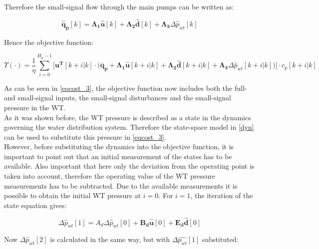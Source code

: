 Therefore the small-signal flow through the main pumps can be written as: 

 \begin{equation}
 \bm{\hat{q}_{p}}[k] =   \bm{\Lambda_1} \bm{\hat{u}}[k] + \bm{\Lambda_2} \bm{\hat{d}}[k] + \bm{\Lambda_3} \Delta \hat{p}_{wt}[k]
 \label{pumpflows_simplified}
\end{equation}

Hence the objective function:

\begin{equation}
 \Upsilon(\cdot) = \frac{1}{\eta} \sum_{i=0}^{H_p-1} \Big[ \bm{u^T}[k+i|k] \cdot \Big(\bm{\bar{q}_p} +  \bm{\Lambda_1} \bm{\hat{u}}[k+i|k] + \bm{\Lambda_2} \bm{\hat{d}}[k+i|k] + \bm{\Lambda_3} \Delta \hat{p}_{wt}[k+i|k]\Big)\Big]  \cdot c_p[k+i|k]
\label{eqcost_3} 
\end{equation}

As can be seen in \eqref{eqcost_3}, the objective function now includes both the full- and small-signal inputs, the small-signal disturbances and the small-signal pressure in the WT.
\\
As it was shown before, the WT pressure is described as a state in the dynamics governing the water distribution system. Therefore the state-space model in \eqref{dyn} can be used to substitute this pressure in \eqref{eqcost_3}. 
\\
However, before substituting the dynamics into the objective function, it is important to point out that an initial measurement of the states has to be available. Also important that here only the deviation from the operating point is taken into account, therefore the operating value of the WT pressure measurements has to be subtracted. Due to the available measurements it is possible to obtain the initial WT pressure at $i = 0$. For $i = 1$, the iteration of the state equation gives:


\begin{equation}
	\Delta \hat p_{wt}[1] = A_d\Delta \hat p_{wt}[0] + \bm{B_d} \bm{\hat{u}}[0] + \bm{E_d} \bm{\hat{d}}[0]
\end{equation}

Now $\Delta \hat p_{wt}[2]$ is calculated in the same way, but with $\Delta \hat{p_{wt}}[1]$ substituted: 

